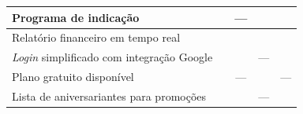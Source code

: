 \begin{quadro}[htb]
\begin{tabular}{|p{6.8cm}|c|c|c|c|}
		Programa de indicação  & \checkmark & — & \checkmark & \checkmark \\ \hline
		Relatório financeiro em tempo real    & \checkmark & \checkmark & \checkmark & \checkmark \\ \hline
		\emph{Login} simplificado com integração Google            & \checkmark & \checkmark &  — & \checkmark \\ \hline
		Plano gratuito disponível                                           & \checkmark & — & \checkmark & — \\ \hline
		Lista de aniversariantes para promoções  & \checkmark & \checkmark & — & \checkmark \\ \hline
		
	\end{tabular}
\end{quadro}
